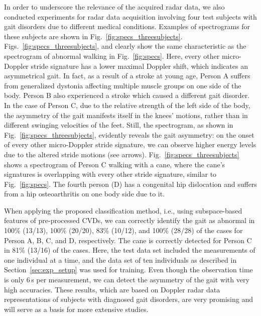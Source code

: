 In order to underscore the relevance of the acquired radar data, we also conducted experiments for radar data acquisition involving four test subjects with gait disorders due to different medical conditions. Examples of spectrograms for these subjects are shown in Fig.~\ref{fig:specs_threesubjects}. Figs.~\ref{fig:specs_threesubjects},  and  clearly show the same characteristic as the spectrogram of abnormal walking in Fig.~\ref{fig:specs}. Here, every other micro-Doppler stride signature has a lower maximal Doppler shift, which indicates an asymmetrical gait. In fact, as a result of a stroke at young age, Person A suffers from generalized dystonia affecting multiple muscle groups on one side of the body. Person B also experienced a stroke which caused a different gait disorder. In the case of Person C, due to the relative strength of the left side of the body, the asymmetry of the gait manifests itself in the knees' motions, rather than in different swinging velocities of the feet. Still, the spectrogram, as shown in Fig.~\ref{fig:specs_threesubjects}, evidently reveals the gait asymmetry: on the onset of every other micro-Doppler stride signature, we can observe higher energy levels due to the altered stride motions (see arrows). Fig.~\ref{fig:specs_threesubjects} shows a spectrogram of Person C walking with a cane, where the cane's signatures is overlapping with every other stride signature, similar to Fig.~\ref{fig:specs}. The fourth person (D) has a congenital hip dislocation and suffers from a hip osteoarthritis on one body side due to it.

When applying the proposed classification method, i.e., using subspace-based features of pre-processed CVDs, we can correctly identify the gait as abnormal in 100\% (13/13), 100\% (20/20), 83\% (10/12), and 100\% (28/28) of the cases for Person A, B, C, and D, respectively. The cane is correctly detected for Person C in 81\% (13/16) of the cases. Here, the test data set included the measurements of one individual at a time, and the data set of ten individuals as described in Section~\ref{sec:exp_setup} was used for training. Even though the observation time is only 6\,s per measurement, we can detect the asymmetry of the gait with very high accuracies. These results, which are based on Doppler radar data representations of subjects with diagnosed gait disorders, are very promising and will serve as a basis for more extensive studies.


